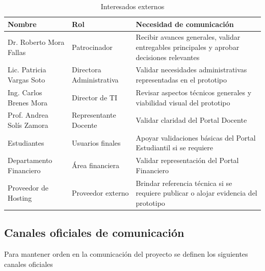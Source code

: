 \documentclass[11pt,spanish]{article}
\begin{document}
\begin{table}[H]
\centering
\caption{Interesados externos}
\label{tab:stakeholders-externos}
{\small
\begin{tabularx}{\textwidth}{p{3.7cm} p{3.9cm} Y}
\toprule
\textbf{Nombre} & \textbf{Rol} & \textbf{Necesidad de comunicación} \\
\midrule
Dr. Roberto Mora Fallas & Patrocinador & Recibir avances generales, validar entregables principales y aprobar decisiones relevantes \\
Lic. Patricia Vargas Soto & Directora Administrativa & Validar necesidades administrativas representadas en el prototipo \\
Ing. Carlos Brenes Mora & Director de TI & Revisar aspectos técnicos generales y viabilidad visual del prototipo \\
Prof. Andrea Solís Zamora & Representante Docente & Validar claridad del Portal Docente \\
Estudiantes & Usuarios finales & Apoyar validaciones básicas del Portal Estudiantil si se requiere \\
Departamento Financiero & Área financiera & Validar representación del Portal Financiero \\
Proveedor de Hosting & Proveedor externo & Brindar referencia técnica si se requiere publicar o alojar evidencia del prototipo \\
\bottomrule
\end{tabularx}
}
\end{table}

\subsection{Canales oficiales de comunicación}

Para mantener orden en la comunicación del proyecto se definen los siguientes canales oficiales
\end{document}
